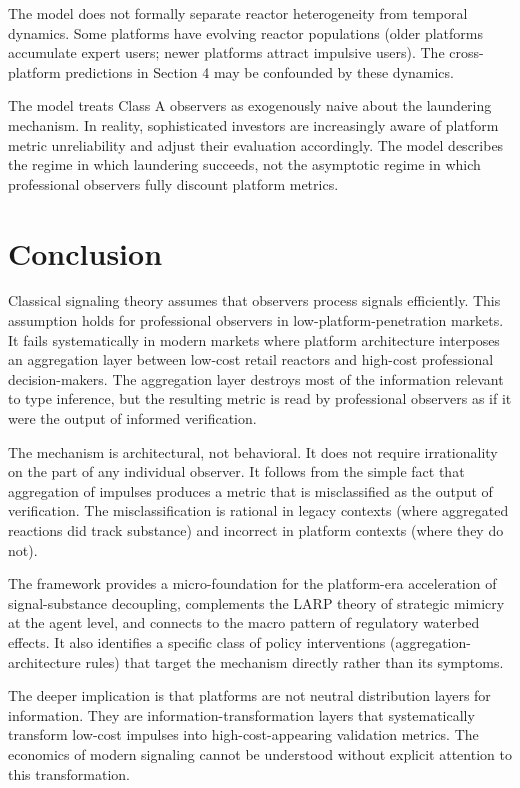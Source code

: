 \documentclass[11pt]{article}
\begin{document}
The model does not formally separate reactor heterogeneity from temporal dynamics. Some platforms have evolving reactor populations (older platforms accumulate expert users; newer platforms attract impulsive users). The cross-platform predictions in Section 4 may be confounded by these dynamics.

The model treats Class A observers as exogenously naive about the laundering mechanism. In reality, sophisticated investors are increasingly aware of platform metric unreliability and adjust their evaluation accordingly. The model describes the regime in which laundering succeeds, not the asymptotic regime in which professional observers fully discount platform metrics.

\section{Conclusion}

Classical signaling theory assumes that observers process signals efficiently. This assumption holds for professional observers in low-platform-penetration markets. It fails systematically in modern markets where platform architecture interposes an aggregation layer between low-cost retail reactors and high-cost professional decision-makers. The aggregation layer destroys most of the information relevant to type inference, but the resulting metric is read by professional observers as if it were the output of informed verification.

The mechanism is architectural, not behavioral. It does not require irrationality on the part of any individual observer. It follows from the simple fact that aggregation of impulses produces a metric that is misclassified as the output of verification. The misclassification is rational in legacy contexts (where aggregated reactions did track substance) and incorrect in platform contexts (where they do not).

The framework provides a micro-foundation for the platform-era acceleration of signal-substance decoupling, complements the LARP theory of strategic mimicry at the agent level, and connects to the macro pattern of regulatory waterbed effects. It also identifies a specific class of policy interventions (aggregation-architecture rules) that target the mechanism directly rather than its symptoms.

The deeper implication is that platforms are not neutral distribution layers for information. They are information-transformation layers that systematically transform low-cost impulses into high-cost-appearing validation metrics. The economics of modern signaling cannot be understood without explicit attention to this transformation.
\end{document}
